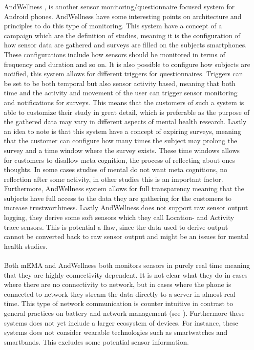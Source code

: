 AndWellness \parencite{hicks2010andwellness}, is another sensor monitoring/questionnaire focused system for Android phones. AndWellness have some interesting points on architecture and principles to do this type of monitoring. This system have a concept of a campaign which are the definition of studies, meaning it is the configuration of how sensor data are gathered and surveys are filled on the subjects smartphones. These configurations include how sensors should be monitored in terms of frequency and duration and so on. It is also possible to configure how subjects are notified, this system allows for different triggers for questionnaires. Triggers can be set to be both temporal but also sensor activity based, meaning that both time and the activity and movement of the user can trigger sensor monitoring and notifications for surveys. This means that the customers of such a system is able to customize their study in great detail, which is preferable as the purpose of the gathered data may vary in different aspects of mental health research. Lastly an idea to note is that this system have a concept of expiring surveys, meaning that the customer can configure how many times the subject may prolong the survey and a time window where the survey exists. These time windows allows for customers to disallow meta cognition, the process of reflecting about ones thoughts. In some cases studies of mental do not want meta cognitions, no reflection after some activity, in other studies this is an important factor. Furthermore, AndWellness system allows for full transparency meaning that the subjects have full access to the data they are gathering for the customers to increase trustworthiness. Lastly AndWellness does not support raw sensor output logging, they derive some soft sensors which they call Location- and Activity trace sensors. This is potential a flaw, since the data used to derive output cannot be converted back to raw sensor output and might be an issues for mental health studies.
\\\\
Both mEMA and AndWellness both monitors sensors in purely real time meaning that they are highly connectivity dependent. It is not clear what they do in cases where there are no connectivity to network, but in cases where the phone is connected to network they stream the data directly to a server in almost real time. This type of network communication is counter intuitive in contrast to general practices on battery and network management (see ). Furthermore these systems does not yet include a larger ecosystem of devices. For instance, these systems does not consider wearable technologies such as smartwatches and smartbands. This excludes some potential sensor information.

